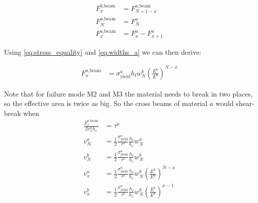 \begin{align}
	F^{b \text{,beam}}_x &= F^{a \text{,beam}}_{N+1-x} \label{eq:beam_force_equality} \\
	F^{a \text{,beam}}_N &= F^a_N \label{eq:beam_force_N}\\
	F^{a \text{,beam}}_x &= F^a_x - F^a_{x+1} \label{eq:beam_force_transfer}
\end{align}

Using \cref{eq:stress_equality} and \cref{eq:widths_a} we can then derive:

\begin{align}
	F^{a \text{,beam}}_x 
	&= \sigma^a_\text{yield} h_\text{f} w^b_N \left(\frac{E^b}{E^a}\right)^{N-x} \label{eq:beam_forces}
\end{align}

Note that for failure mode M2 and M3 the material needs to break in two places, so the effective area is twice as big.
So the cross beams of material $a$ would shear-break when
\begin{align*}
	\frac{F^{a \text{,beam}}_x }{2 v^a_x  h_\text{c}} &= \tau^a \\
	v^a_N
	&= \frac12 \frac{ \sigma^a_\text{yield}}{\tau^a} \frac{ h_\text{f} }{  h_\text{c} } w^a_N  \\
	v^b_N
	&= \frac12 \frac{ \sigma^a_\text{yield}}{\tau^b} \frac{ h_\text{f} }{  h_\text{c} } w^b_N  \\
	v^a_x &=  \frac12 \frac{\sigma^a_\text{yield}}{\tau^a} \frac{h_\text{f}}{h_\text{c} } w^b_N \left(\frac{E^b}{E^a}\right)^{N-x}   \\
	v^b_x
	&=  \frac12 \frac{ \sigma^a_\text{yield} }{\tau^b } \frac{ h_\text{f}  }{h_\text{c}}   w^b_N \left(\frac{E^b}{E^a}\right)^{x-1} \\
\end{align*}

